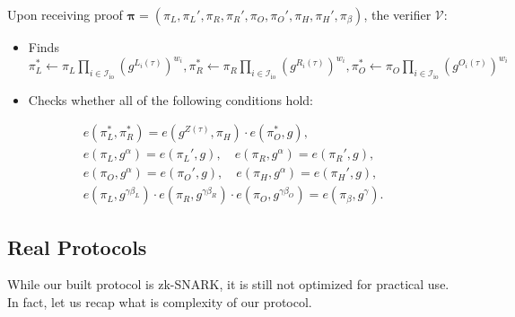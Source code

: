 \documentclass[../lecture-notes.tex]{subfiles}
\begin{document}
\begin{tcolorbox}
    Upon receiving proof $\boldsymbol{\pi} = (\pi_L,\pi_L',\pi_R,\pi_R',\pi_O,\pi_O',\pi_H,\pi_H',\pi_{\beta})$, the verifier $\mathcal{V}$:
    \begin{itemize}[label=]
        \item Finds $\pi_L^* \gets \pi_L\prod_{i \in \mathcal{I}_{\text{io}}} (g^{L_i(\tau)})^{w_i},\pi_R^* \gets \pi_R\prod_{i \in \mathcal{I}_{\text{io}}} (g^{R_i(\tau)})^{w_i},\pi_O^* \gets \pi_O\prod_{i \in \mathcal{I}_{\text{io}}} (g^{O_i(\tau)})^{w_i}$
        \item Checks whether all of the following conditions hold:
    \end{itemize}
    \begin{align*}
        e(\pi_L^*, \pi_R^*) = e(g^{Z(\tau)}, \pi_H) \cdot e(\pi_O^*, g), \\
        e(\pi_L, g^{\alpha}) = e(\pi_L', g), \quad e(\pi_R, g^{\alpha}) = e(\pi_R', g), \\
        e(\pi_O, g^{\alpha}) = e(\pi_O', g), \quad e(\pi_H, g^{\alpha}) = e(\pi_H', g), \\
        e(\pi_L, g^{\gamma\beta_L}) \cdot e(\pi_R, g^{\gamma\beta_R}) \cdot e(\pi_O, g^{\gamma\beta_O}) = e(\pi_{\beta}, g^{\gamma}).
    \end{align*}
\end{tcolorbox}

\subsection{Real Protocols}

While our built protocol is zk-SNARK, it is still not optimized for practical use. In fact, let us recap what is complexity of our protocol.
\end{document}
